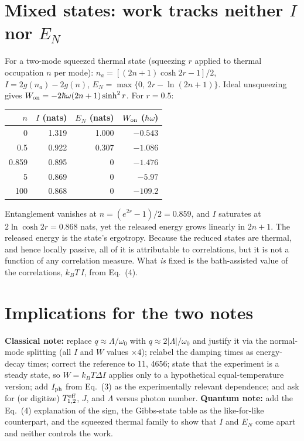 \documentclass[9pt]{article}
\begin{document}
\section{\texorpdfstring{Mixed states: work tracks neither $I$ nor $E_N$}{Mixed states: work tracks neither I nor E-N}}
For a two-mode squeezed thermal state (squeezing $r$ applied to thermal occupation $n$ per mode): $n_a=[(2n+1)\cosh2r-1]/2$, $I=2g(n_a)-2g(n)$, $E_N=\max\{0,\,2r-\ln(2n+1)\}$. Ideal unsqueezing gives $W_{\rm on}=-2\hbar\omega(2n+1)\sinh^2r$. For $r=0.5$:
\begin{center}
\begin{tabular}{rrrr}
\toprule
$n$ & $I$ (nats) & $E_N$ (nats) & $W_{\rm on}$ ($\hbar\omega$)\\
\midrule
0     & 1.319 & 1.000 & $-0.543$\\
0.5   & 0.922 & 0.307 & $-1.086$\\
0.859 & 0.895 & 0     & $-1.476$\\
5     & 0.869 & 0     & $-5.97$\\
100   & 0.868 & 0     & $-109.2$\\
\bottomrule
\end{tabular}
\end{center}
Entanglement vanishes at $n=(e^{2r}-1)/2=0.859$, and $I$ saturates at $2\ln\cosh2r=0.868$ nats, yet the released energy grows linearly in $2n+1$. The released energy is the state's ergotropy. Because the reduced states are thermal, and hence locally passive, all of it is attributable to correlations, but it is not a function of any correlation measure.\cite{perarnau2015,huber2015} What \emph{is} fixed is the bath-assisted value of the correlations, $k_BT\,I$, from Eq.~(4).

\section{Implications for the two notes}
\textbf{Classical note:} replace $q\approx\Lambda/\omega_0$ with $q\approx2|\Lambda|/\omega_0$ and justify it via the normal-mode splitting (all $I$ and $W$ values $\times4$); relabel the damping times as energy-decay times; correct the reference to 11, 4656; state that the experiment is a steady state, so $W=k_BT\Delta I$ applies only to a hypothetical equal-temperature version; add $I_{\rm ph}$ from Eq.~(3) as the experimentally relevant dependence; and ask for (or digitize) $T^{\rm eff}_{1,2}$, $J$, and $\Lambda$ versus photon number.
\textbf{Quantum note:} add the Eq.~(4) explanation of the sign, the Gibbs-state table as the like-for-like counterpart, and the squeezed thermal family to show that $I$ and $E_N$ come apart and neither controls the work.
\end{document}
